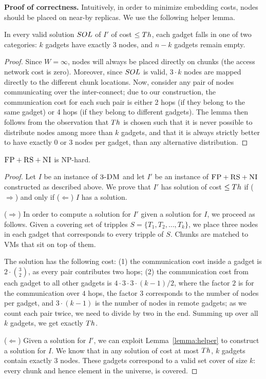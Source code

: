 \textbf{Proof of correctness.}
Intuitively, in order to minimize embedding costs,
nodes should be placed on near-by replicas. We use the following
helper lemma.
\begin{lemma}\label{lemma:helper}
In every valid solution $SOL$ of $I'$ of cost $\leq Th$, each gadget
falls in one of two categories:
$k$ gadgets have exactly
$3$ nodes, and $n-k$ gadgets remain empty.
\end{lemma}
\begin{proof}
Since $W=\infty$, nodes will always be placed
directly on chunks (the access network cost is zero).
Moreover, since
$SOL$ is valid, $3 \cdot k$ nodes are mapped
directly to the different chunk locations.
Now, consider any pair of nodes communicating over the
inter-connect; due to our construction, the communication cost
for each such pair is either
2 hops (if they belong to the same gadget) or 4 hops (if they belong
to different gadgets).
The lemma then follows from the observation that $Th$
is chosen such that it is never possible to distribute nodes
among more than $k$ gadgets, and that it is always strictly better to
have exactly 0 or 3 nodes per gadget, than any alternative distribution.
\end{proof}

\begin{theorem}
$\textsc{FP}+\textsc{RS}+\textsc{NI}$ is NP-hard.
\end{theorem}
\begin{proof}
Let $I$ be an instance of $\textsc{3-DM}$ and let $I'$ be an instance of
$\textsc{FP}+\textsc{RS}+\textsc{NI}$ constructed as described above.
We prove that $I'$ has solution of cost $\leq Th$ if ($\Rightarrow$) and only if
($\Leftarrow$)
$I$ has a solution.

($\Rightarrow$) In order to compute a solution
for $I'$ given a solution for $I$, we proceed as follows.
Given a covering set of tripples $S = \{T_1, T_2, \ldots, T_k\}$, we place three nodes in each gadget that
corresponds to every tripple of $S$. Chunks are matched to VMs that sit on top of them.

The solution has the following cost:
(1) the communication cost inside a gadget is $2 \cdot {3 \choose 2}$,
  as every pair contributes two hops;
  (2) the communication cost from each gadget to all other gadgets is $4
  \cdot 3 \cdot 3 \cdot (k - 1) / 2$, where the factor $2$ is
  for the
  communication over $4$ hops, the factor $3$
  corresponds to the number of nodes per gadget, and
  $3 \cdot (k-1)$ is the number of nodes in remote gadgets;
  as we count each pair twice, we need to divide by two in the end.
Summing up over all $k$ gadgets, we get exactly $Th$.

($\Leftarrow$) Given a solution for $I'$,
we can exploit Lemma~\ref{lemma:helper} to construct a solution for $I$.
We know that in any solution of cost at most $Th$,
$k$ gadgets contain exactly 3 nodes. These gadgets correspond to a valid
set cover of size $k$: every
chunk and hence element in the universe, is covered.
\end{proof}

